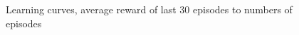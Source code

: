 \documentclass[12pt, a4paper]{article}
\begin{document}
\begin{CJK}{UTF8}{bkai}
\begin{figure}[!htb]
\centering
{}
\hfill
{}
\hfill
\caption{Learning curves, average reward of last 30 episodes to numbers of episodes}
\label{fig:f6}
\end{figure}



\end{CJK}
\end{document}
